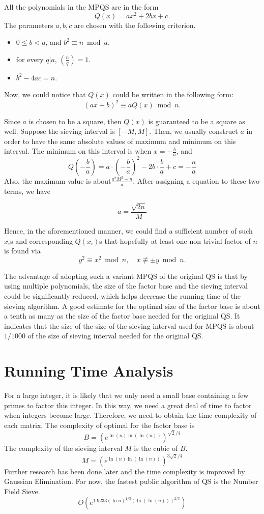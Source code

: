 \documentclass[letterpaper, 10pt, conference]{ieeeconf}  %
\theoremstyle{definition}
\theoremstyle{property}
\begin{document}
All the polynomials in the MPQS are in the form
$$Q(x) = ax^2+2bx+c.$$
The parameters $a,b,c$ are chosen with the following criterion.

\begin{itemize}
    \item $0\leq b<a$, and $b^2\equiv n\bmod a$.
    \item for every $q|a$, $\left(\frac{n}{q}\right) = 1$.
    \item $b^2-4ac = n$.
\end{itemize}

Now, we could notice that $Q(x)$ could be written in the following form:
$$(ax+b)^2\equiv aQ(x)\bmod n.$$

Since $a$ is chosen to be a square, then $Q(x)$ is guaranteed to be a square as well. Suppose the sieving interval is $[-M, M]$. Then, we usually construct $a$ in order to have the same absolute values of maximum and minimum on this interval. The minimum on this interval is when $x=-\frac{b}{a}$, and 
$$Q(-\frac{b}{a})=a\cdot(-\frac{b}{a})^2-2b\cdot\frac{b}{a}+c=-\frac{n}{a}$$
Also, the maximum value is about$\frac{a^2M^2-n}{a}$. After assigning a equation to these two terms, we have 

$$a=\frac{\sqrt{2n}}{M}$$

Hence, in the aforementioned manner, we could find a sufficient number of such $x_i$s and corresponding $Q(x_i)$s that hopefully at least one non-trivial factor of $n$ is found via 
$$y^2\equiv x^2\bmod n,\quad x\not\equiv \pm y\bmod n.$$

The advantage of adopting such a variant MPQS of the original QS is that by using multiple polynomials, the size of the factor base and the sieving interval could be significantly reduced, which helps decrease the running time of the sieving algorithm. A good estimate for the optimal size of the factor base is about a tenth as many as the size of the factor base needed for the original QS. It indicates that the size of the size of the sieving interval used for MPQS is about $1/1000$ of the size of sieving interval needed for the original QS.

\section{Running Time Analysis}
For a large integer, it is likely that we only need a small base containing a few primes to factor this integer. In this way, we need a great deal of time to factor when integers become large. Therefore, we need to obtain the time complexity of each matrix. The complexity of optimal for the factor base is 
$$B=(e^{\ln{(n)}\ln{(\ln{(n)})}})^{\sqrt{2}/4}$$
The complexity of the sieving interval $M$ is the cubic of $B$. 
$$M=(e^{\ln{(n)}\ln{(\ln{(n)})}})^{3\sqrt{2}/4}$$
Further research has been done later and the time complexity is improved by Gaussian Elimination. For now, the fastest public algorithm of QS is the Number Field Sieve. 
$$O(e^{1.9233(\ln{n})^{1/3}(\ln{(\ln{(n)})})^{2/3}})$$
\end{document}

